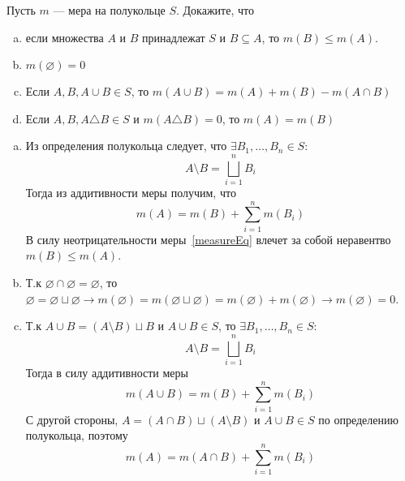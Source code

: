 \begin{task}{2}
Пусть $m$ --- мера на полукольце $S$. Докажите, что
\begin{enumerate}[(a)]
    \item если множества $A$ и $B$ принадлежат $S$ и $B \subseteq A$, то $m(B) \leqslant m(A)$.
    \item $m(\varnothing) = 0$
    \item Если $A, B, A \cup B \in S$, то $m(A \cup B) = m(A) + m(B) - m (A\cap B)$
    \item Если $A, B, A \triangle B \in S$ и $m(A \triangle B) = 0$, то $m(A) = m(B)$
\end{enumerate}
\end{task}
\begin{solution}
\begin{enumerate}[(a)]
    \item Из определения полукольца следует, что $\exists B_1, \dots, B_n \in S :$ 
    \begin{equation*}
        A \setminus B  = \bigsqcup_{i = 1}^{n} B_i
    \end{equation*}
    Тогда из аддитивности меры получим, что
    \begin{equation}\label{measureEq}
        m(A) = m(B) + \sum_{i = 1}^{n} m(B_i)
    \end{equation}
    В силу неотрицательности меры~\eqref{measureEq} влечет за собой неравентво $m(B) \leqslant m(A)$.
    \item Т.к $\varnothing \cap \varnothing = \varnothing$, то $\varnothing = \varnothing \sqcup \varnothing \rightarrow m(\varnothing) = m(\varnothing \sqcup \varnothing) = m(\varnothing) + m(\varnothing) \rightarrow m(\varnothing) = 0$.
    \item Т.к $A \cup B = (A \setminus B) \sqcup B$ и $A \cup B \in S$, то $\exists B_1, \dots, B_n \in S :$
    \begin{equation*}
        A \setminus B  = \bigsqcup_{i = 1}^{n} B_i
    \end{equation*}
    Тогда в силу аддитивности меры
    \begin{equation}\label{2cfirstEq}
        m(A \cup B) = m(B) + \sum_{i = 1}^{n} m(B_i)
    \end{equation}
    С другой стороны, $A = (A \cap B) \sqcup (A \setminus B)$ и $A \cup B \in S$ по определению полукольца, поэтому
    \begin{equation}\label{2csecondEq}
        m(A) = m(A \cap B) + \sum_{i = 1}^{n} m(B_i)
    \end{equation}

\end{enumerate}
\end{solution}
